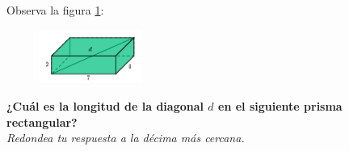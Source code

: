 Observa la figura \ref{fig:pitagoras3D_diag_02}:
\begin{figure}[H]
    \begin{center}
        \includegraphics[width=0.3\textwidth]{../images/pitagoras3D_diag_02.png}
    \end{center}
    \caption{}
    \label{fig:pitagoras3D_diag_02}
\end{figure}
\textbf{¿Cuál es la longitud de la diagonal $d$ en el siguiente prisma rectangular?}\\
\textit{Redondea tu respuesta a la décima más cercana.}